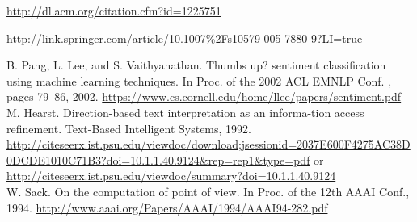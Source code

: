 \documentclass[9pt]{article}
\begin{document}
\begin{thebibliography}{99}
 \url{http://dl.acm.org/citation.cfm?id=1225751}

 \url{http://link.springer.com/article/10.1007\%2Fs10579-005-7880-9?LI=true}

 B. Pang, L. Lee, and  S. Vaithyanathan.   Thumbs  up?  sentiment classification using machine learning techniques.  In Proc. of the 2002 ACL EMNLP Conf. , pages 79–86, 2002. \url{https://www.cs.cornell.edu/home/llee/papers/sentiment.pdf}\\

 M. Hearst. Direction-based text interpretation as an informa-tion access refinement. Text-Based Intelligent Systems, 1992. \url{http://citeseerx.ist.psu.edu/viewdoc/download;jsessionid=2037E600F4275AC38D0DCDE1010C71B3?doi=10.1.1.40.9124&rep=rep1&type=pdf} or \url{http://citeseerx.ist.psu.edu/viewdoc/summary?doi=10.1.1.40.9124}\\

 W. Sack.  On the computation of point of view.  In Proc. of the 12th AAAI Conf., 1994. \url{http://www.aaai.org/Papers/AAAI/1994/AAAI94-282.pdf}
\end{thebibliography}
\end{document}
